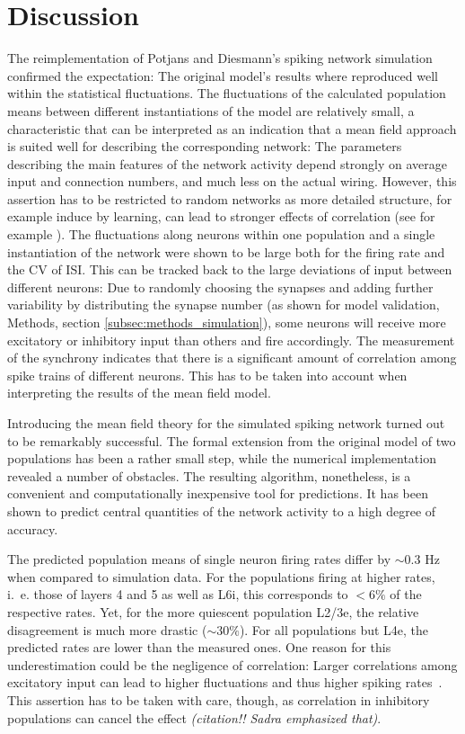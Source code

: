 \chapter{Discussion}
\label{sec:discussion}

The reimplementation of Potjans and Diesmann's spiking network simulation  
confirmed the expectation: The original model's results where reproduced 
well within the statistical fluctuations. The fluctuations of the calculated population 
means between different instantiations of the model are 
relatively small, a characteristic that can be interpreted as an indication that a mean 
field approach is suited well for describing the corresponding network:
The parameters describing the main features of the network activity
depend strongly on average input and connection numbers,
and much less on the actual wiring.
However, this assertion has to be restricted to 
random networks as more detailed structure, for example induce by learning, 
can lead to stronger effects of correlation (see for example ).
The fluctuations along neurons within one population and a single instantiation
of the network were shown to be large both for the firing rate and the 
CV of ISI. This can be tracked back to the large deviations of input between 
different neurons: Due to randomly choosing the synapses and adding further 
variability by distributing the synapse number (as shown for model validation, 
Methods, section \ref{subsec:methods_simulation}), 
some neurons will receive more excitatory or inhibitory input than others 
and fire accordingly. 
The measurement of the synchrony indicates that there is a significant 
amount of correlation among spike trains of different neurons. This has to be taken 
into account when interpreting the results of the mean field model. 

Introducing the mean field theory for the simulated spiking network 
turned out to be remarkably successful. 
The formal extension 
from the original model of two populations has been a rather small step, while
the numerical implementation revealed a number of obstacles. The resulting
algorithm, nonetheless, is a convenient and computationally inexpensive tool for 
predictions. It has been shown to predict central quantities 
of the network activity to a high degree of accuracy.  

The predicted population means of single neuron firing rates differ by 
$\sim 0.3$ Hz when compared to simulation data. For the populations firing at 
higher rates, i.~e. those of layers 4 and 5 as well as L6i, this corresponds 
to $<6 \%$ of the respective rates. Yet, for the more quiescent population L2/3e, 
the relative disagreement is much more drastic ($\sim 30 \%$). 
For all populations but L4e, the predicted rates are lower than the measured ones.  
One reason for this underestimation could be the negligence of correlation: 
Larger correlations among excitatory input can lead to higher fluctuations 
and thus higher spiking rates~\cite{staude2010higher}. This 
assertion has to be taken with care, though, as correlation in inhibitory 
populations can cancel the effect \emph{(citation!! Sadra emphasized that)}. 

